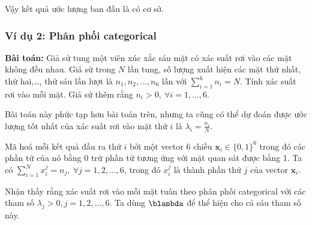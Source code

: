 Vậy kết quả ước lượng ban đầu là có cơ sở. 
 
 
\subsubsection{Ví dụ 2: Phân phối categorical}

\textbf{Bài toán:} Giả sử tung một viên xúc xắc sáu mặt có xác suất rơi vào các
mặt không đều nhau. Giả sử trong $N$ lần tung, số lượng xuất hiện các mặt
thứ nhất, thứ hai,\dots, thứ sáu lần lượt là $n_1, n_2, \dots, n_6$ lần với
$\displaystyle \sum_{i=1}^6 n_i = N$. Tính xác suất rơi vào mỗi mặt. Giả sử thêm rằng $n_i > 0, ~\forall i = 1, \dots, 6.$
 
\lg 
 
Bài toán này phức tạp hơn bài toán trên, nhưng ta cũng có thể dự
đoán được ước lượng tốt nhất của xác suất rơi vào mặt thứ $i$ là $\lambda_i =
\frac{n_i}{N}$. 
 
{Mã hoá} mỗi kết quả đầu ra thứ $i$ bởi một vector 6 chiều $\mathbf{x}_i
\in \{0, 1\}^6$ trong đó các phần tử của nó bằng 0 trừ phần tử tương ứng với mặt
quan sát được bằng 1. Ta có  
  $\sum_{i=1}^N x^j_i = n_j, ~ \forall j = 1, 2, \dots, 6$,
trong đó $x^j_i$ là thành phần thứ $j$ của vector $\mathbf{x}_i$. 
 
Nhận thấy rằng xác suất rơi vào mỗi mặt tuân theo phân phối categorical với
các tham số $\lambda_j > 0, j = 1, 2, \dots, 6$. Ta dùng $\blambda$ để thể hiện
cho cả sáu tham số này. 

